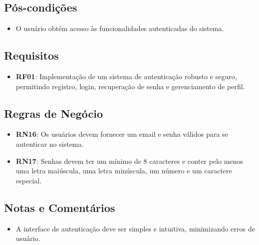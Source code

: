 \subsection*{Pós-condições}
\begin{addmargin}[1.5cm]{0cm}
	\begin{itemize}
		\item O usuário obtém acesso às funcionalidades autenticadas do sistema.
	\end{itemize}
\end{addmargin}

\subsection*{Requisitos}
\begin{addmargin}[1.5cm]{0cm}
	\begin{itemize}
		\item \textbf{RF01}: Implementação de um sistema de autenticação robusto e seguro, permitindo registro, login, recuperação de senha e gerenciamento de perfil.
	\end{itemize}
\end{addmargin}

\subsection*{Regras de Negócio}
\begin{addmargin}[1.5cm]{0cm}
	\begin{itemize}
		\item \textbf{RN16}: Os usuários devem fornecer um email e senha válidos para se autenticar no sistema.
		\item \textbf{RN17}: Senhas devem ter um mínimo de 8 caracteres e conter pelo menos uma letra maiúscula, uma letra minúscula, um número e um caractere especial.
	\end{itemize}
\end{addmargin}

\subsection*{Notas e Comentários}
\begin{addmargin}[1.5cm]{0cm}
	\begin{itemize}
		\item A interface de autenticação deve ser simples e intuitiva, minimizando erros de usuário.
	\end{itemize}
\end{addmargin}
